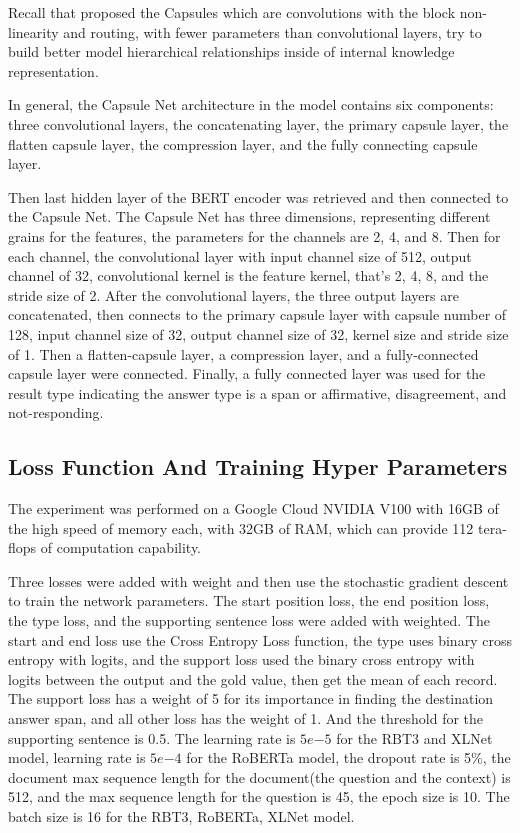 \documentclass[11pt,a4paper]{article}
\begin{document}
Recall that \citet{Sabour2017Dynamic} proposed the Capsules which are convolutions with the block non-linearity and routing, with fewer parameters than convolutional layers,
try to build better model hierarchical relationships inside of internal knowledge representation.

In general, the Capsule Net architecture in the model contains six components: three convolutional layers, the concatenating layer, the primary capsule layer, the flatten capsule layer,
the compression layer, and the fully connecting capsule layer.

Then last hidden layer of the BERT encoder was retrieved and then connected to the Capsule Net.
The Capsule Net has three dimensions, representing different grains for the features, the parameters for the channels are 2, 4, and 8.
Then for each channel, the convolutional layer with input channel size of 512, output channel of 32, convolutional kernel is the feature kernel,
that's 2, 4, 8, and the stride size of 2.
After the convolutional layers, the three output layers are concatenated,
then connects to the primary capsule layer with capsule number of 128, input channel size of 32, output channel size of 32, kernel size and stride size of 1.
Then a flatten-capsule layer, a compression layer, and a fully-connected capsule layer were connected.
Finally, a fully connected layer was used for the result type indicating the answer type is a span or affirmative, disagreement, and not-responding.



\subsection{Loss Function And Training Hyper Parameters}

The experiment was performed on a Google Cloud NVIDIA V100 with 16GB of the high speed of memory each, with 32GB of RAM,
which can provide 112 tera-flops of computation capability.


Three losses were added with weight and then use the stochastic gradient descent to train the network parameters.
The start position loss, the end position loss, the type loss, and the supporting sentence loss were added with weighted.
The start and end loss use the Cross Entropy Loss function, the type uses binary cross entropy with logits,
and the support loss used the binary cross entropy with logits between the output and the gold value, then get the mean of each record.
The support loss has a weight of 5 for its importance in finding the destination answer span, and all other loss has the weight of 1.
And the threshold for the supporting sentence is 0.5.
The learning rate is $5e{-5}$ for the RBT3 and XLNet model, learning rate is $5e{-4}$ for the RoBERTa model, the dropout rate is 5\%, the document max sequence length for the document(the question and the context) is 512, and the max sequence length for the question is 45, the epoch size is 10.
The batch size is 16 for the RBT3, RoBERTa, XLNet model.
\end{document}
